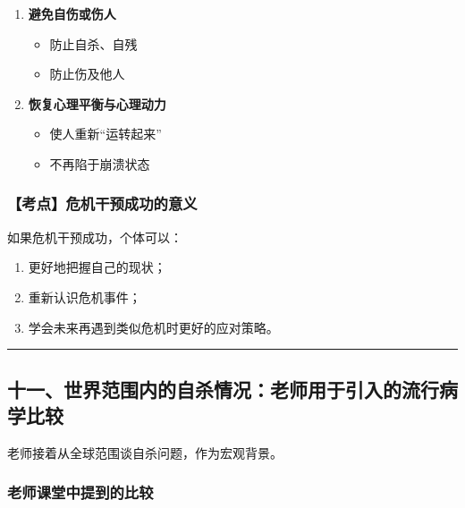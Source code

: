 \documentclass[
  chinese,
  9pt,
  a4paper,
]{ctexart}
\providecommand{\tightlist}{%
  \setlength{\itemsep}{0pt}\setlength{\parskip}{0pt}}
\begin{document}
\begin{enumerate}
\def\labelenumi{\arabic{enumi}.}
\item
  \textbf{避免自伤或伤人}

  \begin{itemize}
  \tightlist
  \item
    防止自杀、自残
  \item
    防止伤及他人
  \end{itemize}
\item
  \textbf{恢复心理平衡与心理动力}

  \begin{itemize}
  \tightlist
  \item
    使人重新``运转起来''
  \item
    不再陷于崩溃状态
  \end{itemize}
\end{enumerate}

\subsubsection{【考点】危机干预成功的意义}\label{ux8003ux70b9ux5371ux673aux5e72ux9884ux6210ux529fux7684ux610fux4e49}

如果危机干预成功，个体可以：

\begin{enumerate}
\def\labelenumi{\arabic{enumi}.}
\tightlist
\item
  更好地把握自己的现状；
\item
  重新认识危机事件；
\item
  学会未来再遇到类似危机时更好的应对策略。
\end{enumerate}

\begin{center}\rule{0.5\linewidth}{0.5pt}\end{center}

\subsection{十一、世界范围内的自杀情况：老师用于引入的流行病学比较}\label{ux5341ux4e00ux4e16ux754cux8303ux56f4ux5185ux7684ux81eaux6740ux60c5ux51b5ux8001ux5e08ux7528ux4e8eux5f15ux5165ux7684ux6d41ux884cux75c5ux5b66ux6bd4ux8f83}

老师接着从全球范围谈自杀问题，作为宏观背景。

\subsubsection{老师课堂中提到的比较}\label{ux8001ux5e08ux8bfeux5802ux4e2dux63d0ux5230ux7684ux6bd4ux8f83}
\end{document}
